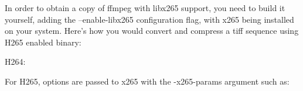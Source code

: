 \begin{fullwidth}
In order to obtain a copy of ffmpeg with libx265 support, you need to build it yourself, adding the --enable-libx265 configuration flag, with x265 being installed on your system. Here’s how you would convert and compress a tiff sequence using H265 enabled binary:

H264:


For H265, options are passed to x265 with the -x265-params argument such as:



\clearpage
\end{fullwidth}